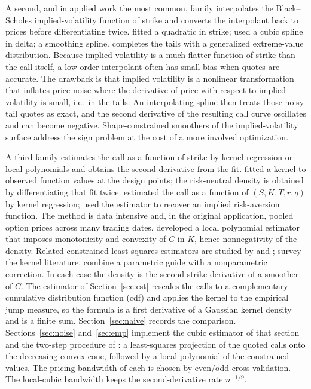 \documentclass[preprint,12pt,authoryear,times]{elsarticle}
\begin{document}
A second, and in applied work the most common, family interpolates the Black--Scholes implied-volatility function of strike and converts the interpolant back to prices before differentiating twice. \citet{shimko1993} fitted a quadratic in strike; \citet{malz1997} used a cubic spline in delta; \citet{bliss2002} a smoothing spline. \citet{figlewski2010} completes the tails with a generalized extreme-value distribution. Because implied volatility is a much flatter function of strike than the call itself, a low-order interpolant often has small bias when quotes are accurate. The drawback is that implied volatility is a nonlinear transformation that inflates price noise where the derivative of price with respect to implied volatility is small, i.e.\ in the tails. An interpolating spline then treats those noisy tail quotes as exact, and the second derivative of the resulting call curve oscillates and can become negative. Shape-constrained smoothers of the implied-volatility surface \citep{fengler2005,fengler2009,gatheraljacquier2014,ludwig2015} address the sign problem at the cost of a more involved optimization.

A third family estimates the call as a function of strike by kernel regression or local polynomials and obtains the second derivative from the fit. \citet{priestley1972} fitted a kernel to observed function values at the design points; the risk-neutral density is obtained by differentiating that fit twice. \citet{aitsahalia1998} estimated the call as a function of \((S,K,T,r,q)\) by kernel regression; \citet{aitsahalia2000} used the estimator to recover an implied risk-aversion function. The method is data intensive and, in the original application, pooled option prices across many trading dates. \citet{aitsahalia2003} developed a local polynomial estimator that imposes monotonicity and convexity of \(C\) in \(K\), hence nonnegativity of the density. Related constrained least-squares estimators are studied by \citet{yatchew2006} and \citet{birke2009}; \citet{grith2012} survey the kernel literature. \citet{fanmancini2009} combine a parametric guide with a nonparametric correction. In each case the density is the second strike derivative of a smoother of \(C\). The estimator of Section~\ref{sec:est} rescales the calls to a complementary cumulative distribution function (cdf) and applies the kernel to the empirical jump measure, so the formula is a first derivative of a Gaussian kernel density and is a finite sum. Section~\ref{sec:naive} records the comparison. Sections~\ref{sec:noise} and~\ref{sec:emp} implement the cubic \citeauthor{priestley1972} estimator of that section and the two-step procedure of \citeauthor{aitsahalia2003}: a least-squares projection of the quoted calls onto the decreasing convex cone, followed by a local polynomial of the constrained values. The pricing bandwidth of each is chosen by even/odd cross-validation. The local-cubic bandwidth keeps the second-derivative rate \(n^{-1/9}\).
\end{document}
